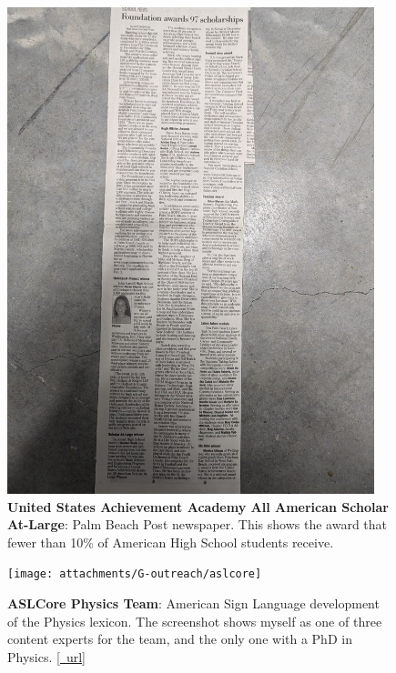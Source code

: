 \begin{figure}[h!]
	\centering
	\caption{\textbf{United States Achievement Academy All American Scholar At-Large}: Palm Beach Post newspaper. This shows the award that fewer than 10\% of American High School students receive.}
	\includegraphics[width=0.95\textwidth]{attachments/G-outreach/scholarAtLargeNewspaper}
\end{figure}

\begin{figure}[h!]
	\centering
	\caption{\textbf{ASLCore Physics Team}: American Sign Language development of the Physics lexicon. The screenshot shows myself as one of three content experts for the team, and the only one with a PhD in Physics. \href{https://aslcore.org}{[~url]}}
	\texttt{[image: attachments/G-outreach/aslcore]}
\end{figure}

